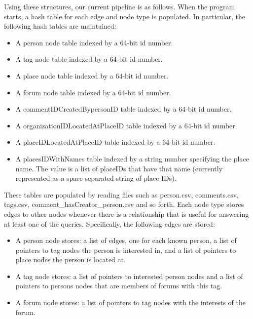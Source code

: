\documentclass{article}
\begin{document}
Using these structures, our current pipeline is as follows. When the program starts, a
hash table for each edge and node type is populated. In particular, the following hash tables are maintained:

\begin{itemize}
\item A person node table indexed by a 64-bit id number.
\item A tag node table indexed by a 64-bit id number.
\item A place node table indexed by a 64-bit id number.
\item A forum node table indexed by a 64-bit id number. 
\item A commentIDCreatedBypersonID table indexed by a 64-bit id number.
\item A organizationIDLocatedAtPlaceID table indexed by a 64-bit id number.
\item A placeIDLocatedAtPlaceID table indexed by a 64-bit id number.
\item A placesIDWithNames table indexed by a string number specifying the place name. The value is a list of placeIDs that have that name (currently represented as a space separated string of place IDs).
\end{itemize}

These tables are populated by reading files such as person.csv,
comments.csv, tags.csv, comment\_hasCreator\_person.csv and so forth.
Each node type stores edges to other nodes whenever there is a relationship
that is useful for answering at least one of the queries. Specifically,
the following edges are stored:

\begin{itemize}
\item A person node stores: a list of edges, one for each known person, a list of pointers to tag nodes the person is interested in, and a list of pointers to place nodes the person is located at.
\item A tag node stores: a list of pointers to interested person nodes and a list of pointers to persons nodes that are members of forums with this tag. 
\item A forum node stores: a list of pointers to tag nodes with the interests of the forum. 
\end{itemize}

\end{document}
